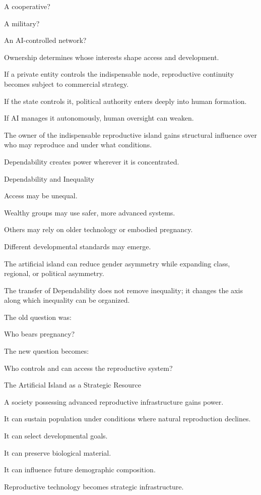 A cooperative?

A military?

An AI-controlled network?

Ownership determines whose interests shape access and development.

If a private entity controls the indispensable node, reproductive continuity becomes subject to commercial strategy.

If the state controls it, political authority enters deeply into human formation.

If AI manages it autonomously, human oversight can weaken.

The owner of the indispensable reproductive island gains structural influence over who may reproduce and under what conditions.

Dependability creates power wherever it is concentrated.

Dependability and Inequality

Access may be unequal.

Wealthy groups may use safer, more advanced systems.

Others may rely on older technology or embodied pregnancy.

Different developmental standards may emerge.

The artificial island can reduce gender asymmetry while expanding class, regional, or political asymmetry.

The transfer of Dependability does not remove inequality; it changes the axis along which inequality can be organized.

The old question was:

Who bears pregnancy?

The new question becomes:

Who controls and can access the reproductive system?

The Artificial Island as a Strategic Resource

A society possessing advanced reproductive infrastructure gains power.

It can sustain population under conditions where natural reproduction declines.

It can select developmental goals.

It can preserve biological material.

It can influence future demographic composition.

Reproductive technology becomes strategic infrastructure.

